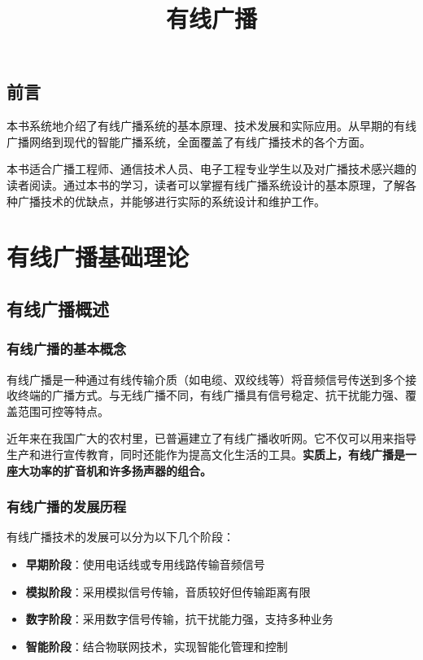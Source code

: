 \documentclass[12pt,UTF8]{ctexbook}
\title{\heiti\zihao{0} 有线广播}
\author{}
\date{}
\begin{document}
\maketitle
\tableofcontents

\frontmatter
\chapter{前言}

本书系统地介绍了有线广播系统的基本原理、技术发展和实际应用。从早期的有线广播网络到现代的智能广播系统，全面覆盖了有线广播技术的各个方面。

本书适合广播工程师、通信技术人员、电子工程专业学生以及对广播技术感兴趣的读者阅读。通过本书的学习，读者可以掌握有线广播系统设计的基本原理，了解各种广播技术的优缺点，并能够进行实际的系统设计和维护工作。

\mainmatter

\part{有线广播基础理论}

\chapter{有线广播概述}

\section{有线广播的基本概念}

有线广播是一种通过有线传输介质（如电缆、双绞线等）将音频信号传送到多个接收终端的广播方式。与无线广播不同，有线广播具有信号稳定、抗干扰能力强、覆盖范围可控等特点。

近年来在我国广大的农村里，已普遍建立了有线广播收听网。它不仅可以用来指导生产和进行宣传教育，同时还能作为提高文化生活的工具。\textbf{实质上，有线广播是一座大功率的扩音机和许多扬声器的组合。}

\section{有线广播的发展历程}

有线广播技术的发展可以分为以下几个阶段：

\begin{itemize}[leftmargin=3.5em]
    \item \textbf{早期阶段}：使用电话线或专用线路传输音频信号
    \item \textbf{模拟阶段}：采用模拟信号传输，音质较好但传输距离有限
    \item \textbf{数字阶段}：采用数字信号传输，抗干扰能力强，支持多种业务
    \item \textbf{智能阶段}：结合物联网技术，实现智能化管理和控制
\end{itemize}
\end{document}
